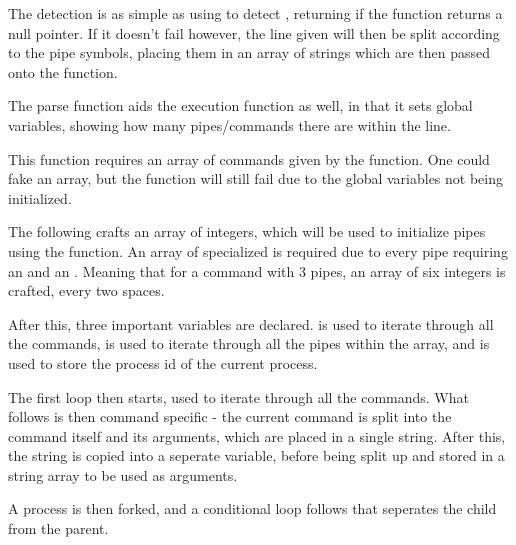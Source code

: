\documentclass[12pt, a4paper]{report}
\begin{document}
                The detection is as simple as using  to detect
                \tx{|}, returning  if the function returns a null pointer.
                If it doesn't fail however, the line given will then be split
                according to the pipe symbols, placing them in an array of 
                strings which are then passed onto the  function.

                The parse function aids the execution function as well, in that
                it sets global variables, showing how many pipes/commands there
                are within the line.
                \clearpage

                This function requires an array of commands given by the 
                function. One could fake an array, but the function will still fail
                due to the global variables not being initialized.

                \begingroup
                \fontsize{10pt}{10pt}\selectfont
                \endgroup

                The following crafts an array of integers, which will be used to 
                initialize pipes using the  function. An array of specialized
                 is required due to every pipe requiring an 
                and an . Meaning that for a command with 3 pipes, an array
                of six integers is crafted,  every two spaces.

                After this, three important variables are declared.
                 is used to iterate through all the commands,
                 is used to iterate through all the pipes within the array,
                and  is used to store the process id of the current process.

                The first loop then starts, used to iterate through all the commands.
                What follows is then command specific - the current command is split into
                the command itself and its arguments, which are placed in a single string.
                After this, the string is copied into a seperate variable, before being
                split up and stored in a string array to be used as arguments.

                A process is then forked, and a conditional loop follows that seperates 
                the child from the parent.
\end{document}
